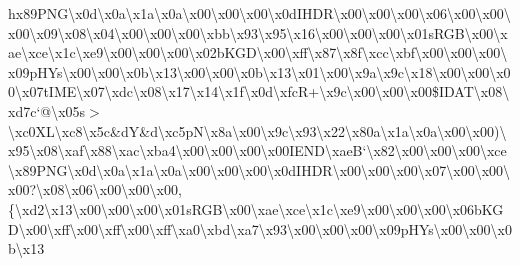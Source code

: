 \begin{DoxyCompactItemize}
h{}x89\+P\+N\+G\textbackslash{}x0d\textbackslash{}x0a\textbackslash{}x1a\textbackslash{}x0a\textbackslash{}x00\textbackslash{}x00\textbackslash{}x00\textbackslash{}x0d\+I\+H\+D\+R\textbackslash{}x00\textbackslash{}x00\textbackslash{}x00\textbackslash{}x06\textbackslash{}x00\textbackslash{}x00\textbackslash{}x00\textbackslash{}x09\textbackslash{}x08\textbackslash{}x04\textbackslash{}x00\textbackslash{}x00\textbackslash{}x00\textbackslash{}xbb\textbackslash{}x93\textbackslash{}x95\textbackslash{}x16\textbackslash{}x00\textbackslash{}x00\textbackslash{}x00\textbackslash{}x01s\+R\+G\+B\textbackslash{}x00\textbackslash{}xae\textbackslash{}xce\textbackslash{}x1c\textbackslash{}xe9\textbackslash{}x00\textbackslash{}x00\textbackslash{}x00\textbackslash{}x02b\+K\+G\+D\textbackslash{}x00\textbackslash{}xff\textbackslash{}x87\textbackslash{}x8f\textbackslash{}xcc\textbackslash{}xbf\textbackslash{}x00\textbackslash{}x00\textbackslash{}x00\textbackslash{}x09p\+H\+Ys\textbackslash{}x00\textbackslash{}x00\textbackslash{}x0b\textbackslash{}x13\textbackslash{}x00\textbackslash{}x00\textbackslash{}x0b\textbackslash{}x13\textbackslash{}x01\textbackslash{}x00\textbackslash{}x9a\textbackslash{}x9c\textbackslash{}x18\textbackslash{}x00\textbackslash{}x00\textbackslash{}x00\textbackslash{}x07t\+I\+M\+E\textbackslash{}x07\textbackslash{}xdc\textbackslash{}x08\textbackslash{}x17\textbackslash{}x14\textbackslash{}x1f\textbackslash{}x0d\textbackslash{}xfc\+R+\textbackslash{}x9c\textbackslash{}x00\textbackslash{}x00\textbackslash{}x00\$\+I\+D\+A\+T\textbackslash{}x08\textbackslash{}xd7c`@\textbackslash{}x05s$>$\textbackslash{}xc0\+X\+L\textbackslash{}xc8\textbackslash{}x5c\&d\+Y\&d\textbackslash{}xc5p\+N\textbackslash{}x8a\textbackslash{}x00\textbackslash{}x9c\textbackslash{}x93\textbackslash{}x22\textbackslash{}x80a\textbackslash{}x1a\textbackslash{}x0a\textbackslash{}x00\textbackslash{}x00)\textbackslash{}x95\textbackslash{}x08\textbackslash{}xaf\textbackslash{}x88\textbackslash{}xac\textbackslash{}xba4\textbackslash{}x00\textbackslash{}x00\textbackslash{}x00\textbackslash{}x00\+I\+E\+N\+D\textbackslash{}xae\+B`\textbackslash{}x82\textbackslash{}x00\textbackslash{}x00\textbackslash{}x00\textbackslash{}xce\textbackslash{}x89\+P\+N\+G\textbackslash{}x0d\textbackslash{}x0a\textbackslash{}x1a\textbackslash{}x0a\textbackslash{}x00\textbackslash{}x00\textbackslash{}x00\textbackslash{}x0d\+I\+H\+D\+R\textbackslash{}x00\textbackslash{}x00\textbackslash{}x00\textbackslash{}x07\textbackslash{}x00\textbackslash{}x00\textbackslash{}x00?\textbackslash{}x08\textbackslash{}x06\textbackslash{}x00\textbackslash{}x00\textbackslash{}x00,\{\textbackslash{}xd2\textbackslash{}x13\textbackslash{}x00\textbackslash{}x00\textbackslash{}x00\textbackslash{}x01s\+R\+G\+B\textbackslash{}x00\textbackslash{}xae\textbackslash{}xce\textbackslash{}x1c\textbackslash{}xe9\textbackslash{}x00\textbackslash{}x00\textbackslash{}x00\textbackslash{}x06b\+K\+G\+D\textbackslash{}x00\textbackslash{}xff\textbackslash{}x00\textbackslash{}xff\textbackslash{}x00\textbackslash{}xff\textbackslash{}xa0\textbackslash{}xbd\textbackslash{}xa7\textbackslash{}x93\textbackslash{}x00\textbackslash{}x00\textbackslash{}x00\textbackslash{}x09p\+H\+Ys\textbackslash{}x00\textbackslash{}x00\textbackslash{}x0b\textbackslash{}x13\textbacksla
\end{DoxyCompactItemize}
